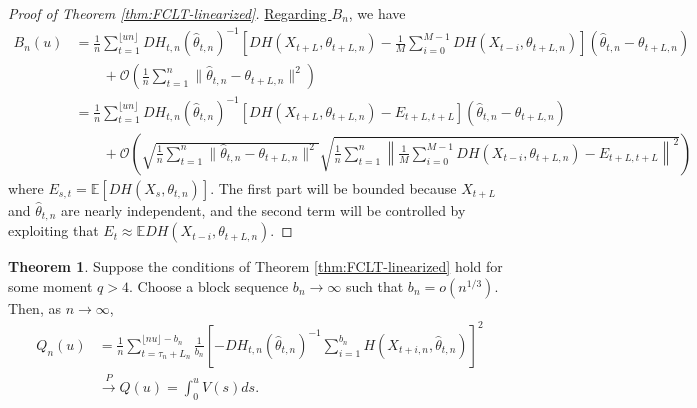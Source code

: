\documentclass[12pt,a4paper]{article}
\theoremstyle{definition}
\theoremstyle{definition}
\theoremstyle{theorem}
\newtheorem{theorem}{Theorem}[section]
\newcommand{\E}{\mathbb{E}}
\begin{document}
\begin{proof}[Proof of Theorem \ref{thm:FCLT-linearized}]
    \underline{Regarding $B_n$}, we have
    \begin{align*}
        B_n(u)
        &= \frac{1}{n} \sum_{t=1}^{\lfloor un \rfloor} DH_{t,n}(\widehat{\theta}_{t,n})^{-1} \left[ D H(X_{t+L}, \theta_{t+L,n}) - \frac{1}{M} \sum_{i=0}^{M-1} DH(X_{t-i}, \theta_{t+L,n})\right](\widehat{\theta}_{t,n}-\theta_{t+L,n}) \\
        &\qquad + \mathcal{O}\left( \frac{1}{n}\sum_{t=1}^n \|\widehat{\theta}_{t,n}-\theta_{t+L,n}\|^2 \right) \\
        &= \frac{1}{n} \sum_{t=1}^{\lfloor un \rfloor} DH_{t,n}(\widehat{\theta}_{t,n})^{-1} \left[ D H(X_{t+L}, \theta_{t+L,n}) - E_{t+L,t+L} \right](\widehat{\theta}_{t,n}-\theta_{t+L,n}) \\
        &\qquad + \mathcal{O}\left( \sqrt{ \frac{1}{n}\sum_{t=1}^n \|\widehat{\theta}_{t,n}-\theta_{t+L,n}\|^2} \sqrt{  \frac{1}{n}\sum_{t=1}^n \left\| \frac{1}{M} \sum_{i=0}^{M-1} DH(X_{t-i}, \theta_{t+L,n}) -E_{t+L,t+L}  \right\|^2  } \right)
    \end{align*}
    where $E_{s,t}=\E [DH(X_s, \theta_{t,n})]$.
    \color{purple}The first part will be bounded because $X_{t+L}$ and $\widehat{\theta}_{t,n}$ are nearly independent, and the second term will be controlled by exploiting that $E_t\approx \E DH(X_{t-i}, \theta_{t+L,n})$.\color{black}
\end{proof}




\begin{theorem}\label{thm: variance_consistency}
Suppose the conditions of Theorem \ref{thm:FCLT-linearized} hold for some moment $q > 4$. Choose a block sequence $b_n \to \infty$ such that $b_n = o(n^{1/3})$. Then, as $n \to \infty$,
\begin{align*}
    Q_n(u) & =  \frac{1}{n} \sum_{t=\tau_n+L_n}^{\lfloor nu \rfloor - b_n} \frac{1}{b_n} \left[ -DH_{t,n}(\widehat{\theta}_{t,n})^{-1} \sum_{i=1}^{b_n} H(X_{t+i,n}, \widehat{\theta}_{t,n})\right]^2 \\ &\xrightarrow{P} Q(u) = \int_0^u V(s) ds.
    \ 
\end{align*}
    

\end{theorem}
\end{document}
